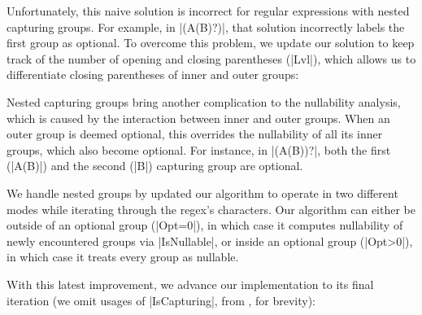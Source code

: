 \regexNaiveIsNullable
%

\noindent
Unfortunately, this naive solution is incorrect for regular expressions with nested capturing groups.
For example, in |(A(B)?)|, that solution incorrectly labels the first group as optional.
To overcome this problem, we update our solution to keep track of the number of opening and closing parentheses (|Lvl|), which allows us to differentiate closing parentheses of inner and outer groups:

\regexIsNullable

Nested capturing groups bring another complication to the nullability analysis, which is caused by the interaction between inner and outer groups.
When an outer group is deemed optional, this overrides the nullability of all its inner groups, which also become optional.
For instance, in |(A(B))?|, both the first (|A(B)|) and the second (|B|) capturing group are optional.

We handle nested groups by updated our algorithm to operate in two different modes while iterating through the regex's characters.
Our algorithm can either be outside of an optional group (|Opt=0|), in which case it computes nullability of newly encountered groups via |IsNullable|, or inside an optional group (|Opt>0|), in which case it treats every group as nullable.

With this latest improvement, we advance our implementation to its final iteration (we omit usages of |IsCapturing|, from , for brevity):

\regexLastIteration


